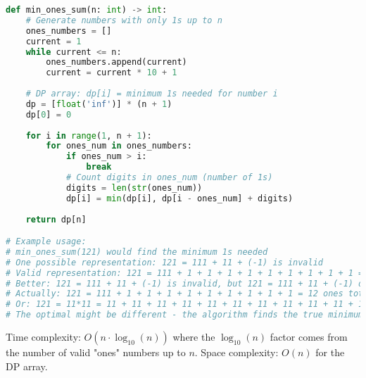 \begin{lstlisting}[language=Python, caption=Minimum 1s Representation]
def min_ones_sum(n: int) -> int:
    # Generate numbers with only 1s up to n
    ones_numbers = []
    current = 1
    while current <= n:
        ones_numbers.append(current)
        current = current * 10 + 1
    
    # DP array: dp[i] = minimum 1s needed for number i
    dp = [float('inf')] * (n + 1)
    dp[0] = 0
    
    for i in range(1, n + 1):
        for ones_num in ones_numbers:
            if ones_num > i:
                break
            # Count digits in ones_num (number of 1s)
            digits = len(str(ones_num))
            dp[i] = min(dp[i], dp[i - ones_num] + digits)
    
    return dp[n]

# Example usage:
# min_ones_sum(121) would find the minimum 1s needed
# One possible representation: 121 = 111 + 11 + (-1) is invalid
# Valid representation: 121 = 111 + 1 + 1 + 1 + 1 + 1 + 1 + 1 + 1 + 1 = 12 ones
# Better: 121 = 111 + 11 + (-1) is invalid, but 121 = 111 + 11 + (-1) doesn't work
# Actually: 121 = 111 + 1 + 1 + 1 + 1 + 1 + 1 + 1 + 1 + 1 = 12 ones total
# Or: 121 = 11*11 = 11 + 11 + 11 + 11 + 11 + 11 + 11 + 11 + 11 + 11 + 11 = 22 ones
# The optimal might be different - the algorithm finds the true minimum
\end{lstlisting}

Time complexity: $O(n \cdot \log_{10}(n))$ where the $\log_{10}(n)$ factor comes from the number of valid "ones" numbers up to $n$.
Space complexity: $O(n)$ for the DP array.